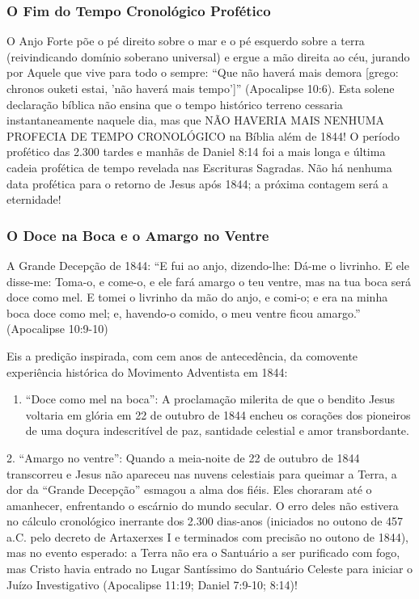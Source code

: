 \subsubsection*{O Fim do Tempo Cronológico Profético}
O Anjo Forte põe o pé direito sobre o mar e o pé esquerdo sobre a terra (reivindicando domínio soberano universal) e ergue a mão direita ao céu, jurando por Aquele que vive para todo o sempre: ``Que não haverá mais demora [grego: chronos ouketi estai, 'não haverá mais tempo']'' (Apocalipse 10:6).
Esta solene declaração bíblica não ensina que o tempo histórico terreno cessaria instantaneamente naquele dia, mas que NÃO HAVERIA MAIS NENHUMA PROFECIA DE TEMPO CRONOLÓGICO na Bíblia além de 1844! O período profético das 2.300 tardes e manhãs de Daniel 8:14 foi a mais longa e última cadeia profética de tempo revelada nas Escrituras Sagradas. Não há nenhuma data profética para o retorno de Jesus após 1844; a próxima contagem será a eternidade!


\subsubsection*{O Doce na Boca e o Amargo no Ventre}
A Grande Decepção de 1844:
``E fui ao anjo, dizendo-lhe: Dá-me o livrinho. E ele disse-me: Toma-o, e come-o, e ele fará amargo o teu ventre, mas na tua boca será doce como mel. E tomei o livrinho da mão do anjo, e comi-o; e era na minha boca doce como mel; e, havendo-o comido, o meu ventre ficou amargo.'' (Apocalipse 10:9-10)

Eis a predição inspirada, com cem anos de antecedência, da comovente experiência histórica do Movimento Adventista em 1844:
\begin{enumerate}
  \item ``Doce como mel na boca'': A proclamação milerita de que o bendito Jesus voltaria em glória em 22 de outubro de 1844 encheu os corações dos pioneiros de uma doçura indescritível de paz, santidade celestial e amor transbordante.
\end{enumerate}

2. ``Amargo no ventre'': Quando a meia-noite de 22 de outubro de 1844 transcorreu e Jesus não apareceu nas nuvens celestiais para queimar a Terra, a dor da ``Grande Decepção'' esmagou a alma dos fiéis. Eles choraram até o amanhecer, enfrentando o escárnio do mundo secular. O erro deles não estivera no cálculo cronológico inerrante dos 2.300 dias-anos (iniciados no outono de 457 a.C. pelo decreto de Artaxerxes I e terminados com precisão no outono de 1844), mas no evento esperado: a Terra não era o Santuário a ser purificado com fogo, mas Cristo havia entrado no Lugar Santíssimo do Santuário Celeste para iniciar o Juízo Investigativo (Apocalipse 11:19; Daniel 7:9-10; 8:14)!


